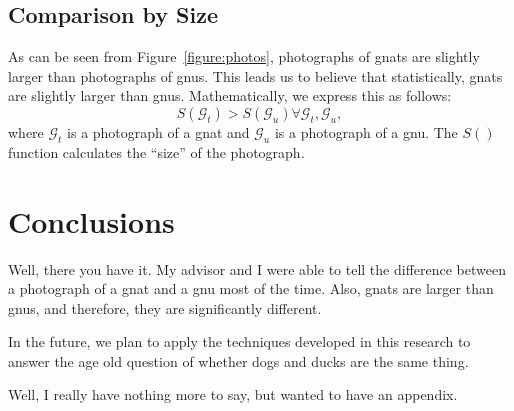 \documentclass[12pt]{thesis}
\begin{document}
\section{Comparison by Size}
 As can be seen from
Figure~\ref{figure:photos}, photographs of gnats are slightly larger
than photographs of gnus.  This leads us to believe that
statistically, gnats are slightly larger than gnus.  Mathematically,
we express this as follows:
\begin{equation}
S(\mathcal{G}_t) > S(\mathcal{G}_u) \forall
\mathcal{G}_t,\mathcal{G}_u,
\end{equation}
where $\mathcal{G}_t$ is a photograph of a gnat and $\mathcal{G}_u$ is
a photograph of a gnu.  The $S()$ function calculates the ``size'' of
the photograph.

\chapter{Conclusions}

Well, there you have it.  My advisor and I were able to tell the
difference between a photograph of a gnat and a gnu most of the time.
Also, gnats are larger than gnus, and therefore, they are
significantly different.

In the future, we plan to apply the techniques developed in this
research to answer the age old question of whether dogs and ducks are
the same thing.

\supplementaries





\begin{appendices}

 Well, I really have nothing more to say,
but wanted to have an appendix.

\end{appendices}



\end{document}
